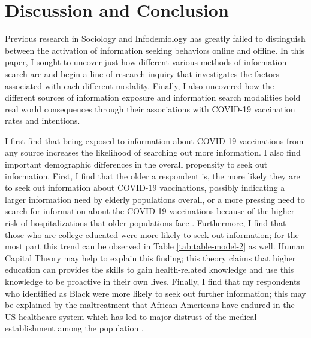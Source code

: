 \hypertarget{discussion}{\section{Discussion and Conclusion}\label{discussion}}

Previous research in Sociology and Infodemiology has greatly failed to
distinguish between the activation of information seeking behaviors online and
offline. In this paper, I sought to uncover just how different various methods
of information search are and begin a line of research inquiry that investigates
the factors associated with each different modality. Finally, I also uncovered
how the different sources of information exposure and information search
modalities hold real world consequences through their associations with COVID-19
vaccination rates and intentions.


I first find that being exposed to information about COVID-19 vaccinations from
any source increases the likelihood of searching out more information. I also
find important demographic differences in the overall propensity to seek out
information. First, I find that the older a respondent is, the more likely they
are to seek out information about COVID-19 vaccinations, possibly indicating a
larger information need by elderly populations overall, or a more pressing need
to search for information about the COVID-19 vaccinations because of the higher
risk of hospitalizations that older populations face \citep{turner_etal18}.
Furthermore, I find that those who are college educated were more likely to seek
out information; for the most part this trend can be observed in Table
\ref{tab:table-model-2} as well. Human Capital Theory \citep{mirowsky_ross98}
may help to explain this finding; this theory claims that higher education can
provides the skills to gain health-related knowledge and use this knowledge to
be proactive in their own lives. Finally, I find that my respondents who
identified as Black were more likely to seek out further information; this may
be explained by the maltreatment that African Americans have endured in the US
healthcare system \citep{baileyStructuralRacismHealth2017} which has led to
major distrust of the medical establishment among the population
\citep{center2019, murray15, bronson2014don}.

